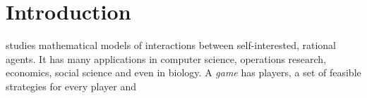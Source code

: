 \section{Introduction}

 studies mathematical models of interactions between self-interested, rational agents. 
It has many applications in computer science, operations research, economics, social science and even in biology. 
A \emph{game} has players, a set of feasible strategies for every player and 